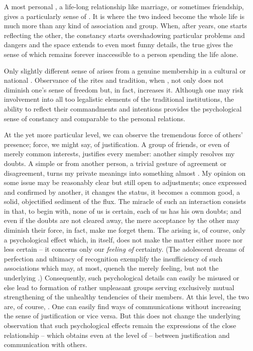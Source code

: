 {  \mine A most personal , a life-long relationship like marriage,
  or sometimes friendship, gives a particularly  sense of
  . It is  where the two indeed become   the whole life is much more than any
  kind of association and group. When, after years, one starts reflecting the
  other, the constancy starts overshadowing particular problems and dangers and
  the  space extends to even most funny details, the true
   gives the sense of  which remains
  forever inaccessible to a person spending the life alone.
  
  Only slightly different sense of  arises from a genuine
  membership in a cultural or national . Observance of the rites
  and tradition, when , not only does not diminish one's
  sense of freedom but, in fact, increases it. Although one may risk involvement
  into all too legalistic elements of the traditional institutions, the ability
  to reflect their commandments and intentions provides the psychological sense
  of constancy and  comparable to the personal relations.
  
  \act At the yet more particular level, we can observe the tremendous force of
  others' presence; force, we might say, of justification. A group of friends,
  or even of merely common interests, justifies every member: another simply
  resolves my doubts. A simple  or  from another person, a
  trivial gesture of agreement or disagreement, turns my private meanings into
  something almost . My opinion on some issue may be reasonably
  clear but still open to adjustments; once expressed and confirmed by another,
  it changes the status, it becomes a common good, a solid, {objectified}
  sediment of the  flux. The miracle of such an interaction
  consists in that, to begin with, none of us is certain, each of us has his own
  doubts; and even if the doubts are not cleared away, the mere acceptance by
  the other may diminish their force, in fact, make me forget them. The arising
   is, of course, only a psychological effect which, in itself,
  does not make the matter either more nor less certain -- it concerns only our
  {\em feeling of} certainty. (The adolescent dreams of perfection and ultimacy
  of recognition exemplify the insufficiency of such associations which may, at
  most, quench the merely  feeling, but not the underlying
  .)  Consequently, such psychological details can easily be misused
  or else lead to formation of rather unpleasant groups serving exclusively
  mutual strengthening of the unhealthy tendencies of their members.  At this
  level, the two  are, of course, . One can easily
  find ways of communications without increasing the sense of justification or
  vice versa. But this does not change the underlying observation that such
  psychological effects remain the expressions of the close relationship --
  which obtains even at the level of  -- between justification and
  communication with others.
  
}
